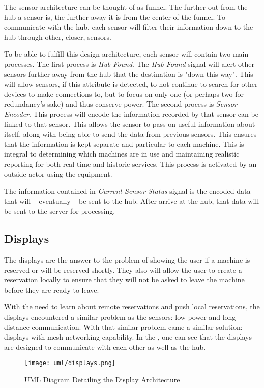 \documentclass[PPFS.tex]{template/subfiles}
\newcommand{\sn}[1]{\textit{#1}}
\begin{document}
The sensor architecture can be thought of as funnel. The further out from the hub a sensor is, the further away it is from the center of the funnel. To communicate with the hub, each sensor will filter their information down to the hub through other, closer, sensors.

To be able to fulfill this design architecture, each sensor will contain two main processes. The first process is \sn{Hub Found}. The \sn{Hub Found} signal will alert other sensors further away from the hub that the destination is "down this way". This will allow sensors, if this attribute is detected, to not continue to search for other devices to make connections to, but to focus on only one (or perhaps two for redundancy's sake) and thus conserve power. The second process is \sn{Sensor Encoder}. This process will encode the information recorded by that sensor can be linked to that sensor. This allows the sensor to pass on useful information about itself,  along with being able to send the data from previous sensors. This ensures that the information is kept separate and particular to each machine. This is integral to determining which machines are in use and maintaining realistic reporting for both real-time and historic services. This process is activated by an outside actor using the equipment.

The information contained in \sn{Current Sensor Status} signal is the encoded data that will -- eventually -- be sent to the hub. After arrive at the hub, that data will be sent to the server for processing.

\subsection{Displays}

The displays are the answer to the problem of showing the user if a machine is reserved or will be reserved shortly. They also will allow the user to create a reservation locally to ensure that they will not be asked to leave the machine before they are ready to leave.

With the need to learn about remote reservations and push local reservations, the displays encountered a similar problem as the sensors: low power and long distance communication. With that similar problem came a similar solution: displays with mesh networking capability. In the , one can see that the displays are designed to communicate with each other as well as the hub.

\begin{figure}[H]
    \centering
    \texttt{[image: uml/displays.png]}
    \caption{UML Diagram Detailing the Display Architecture}
    \label{fig:display_arch}
\end{figure}
\end{document}
